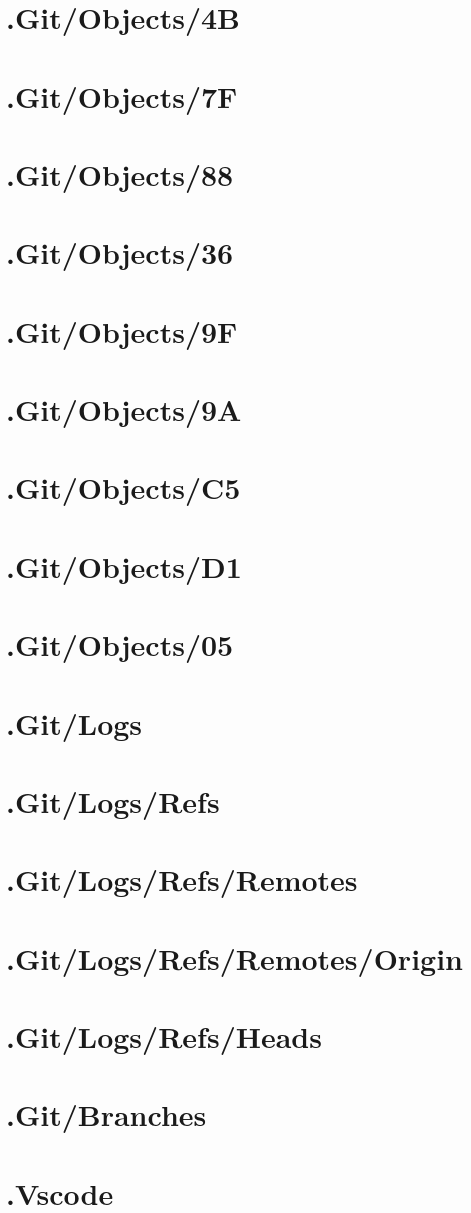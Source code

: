 \section*{.Git/Objects/4B}

\section*{.Git/Objects/7F}

\section*{.Git/Objects/88}

\section*{.Git/Objects/36}

\section*{.Git/Objects/9F}

\section*{.Git/Objects/9A}

\section*{.Git/Objects/C5}

\section*{.Git/Objects/D1}

\section*{.Git/Objects/05}

\section*{.Git/Logs}

\section*{.Git/Logs/Refs}

\section*{.Git/Logs/Refs/Remotes}

\section*{.Git/Logs/Refs/Remotes/Origin}

\section*{.Git/Logs/Refs/Heads}

\section*{.Git/Branches}

\section*{.Vscode}

